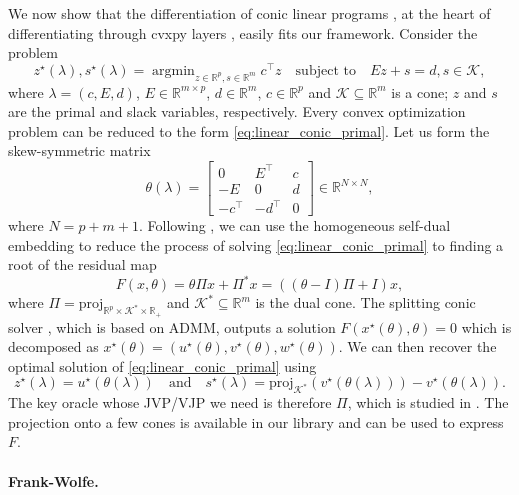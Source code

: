 \documentclass{article}
\def\cK{{\mathcal{K}}}
\def\RR{{\mathbb R}}
\def\proj{{\text{proj}}}
\DeclareMathOperator*{\argmin}{argmin}
\begin{document}
We now show that the differentiation of conic linear programs
\cite{agrawal_cone,amos_thesis}, at the heart of differentiating through cvxpy
layers \cite{agrawal_2019}, easily fits our framework.
Consider the problem
\begin{equation}
z^\star(\lambda), s^\star(\lambda) =
\argmin_{z \in \RR^p, s \in \RR^m} c^\top z 
\quad \text{subject to} \quad
Ez + s = d, s \in \cK,
\label{eq:linear_conic_primal}
\end{equation}
where $\lambda = (c, E, d)$, 
$E \in \RR^{m \times p}$, $d \in \RR^m$, $c \in \RR^p$ and $\cK \subseteq
\RR^m$ is a cone;
$z$ and $s$ are the primal and slack variables, respectively.
Every convex optimization problem can be reduced to the form
\eqref{eq:linear_conic_primal}.
Let us form the skew-symmetric matrix
\begin{equation}
\theta(\lambda) =
\begin{bmatrix}
    0 & E^\top & c \\
    -E & 0 & d \\
    -c^\top & -d^\top & 0
\end{bmatrix}
\in \RR^{N \times N},
\end{equation}
where $N = p + m + 1$.
Following \cite{agrawal_cone,agrawal_2019,amos_thesis},
we can use the homogeneous self-dual embedding 
to reduce the process of solving \eqref{eq:linear_conic_primal} to finding
a root of the residual map
\begin{equation}
F(x, \theta) 
= \theta \Pi x + \Pi^* x
= ((\theta - I) \Pi + I) x,
\label{eq:residual_map}
\end{equation}
where $\Pi = \proj_{\RR^p \times \cK^* \times \RR_+}$
and $\cK^* \subseteq \RR^m$ is the dual cone. 
The splitting conic solver \cite{splitting_conic}, which is based on 
ADMM, outputs a solution 
$F(x^\star(\theta), \theta) = 0$ which is decomposed as
$x^\star(\theta) = (u^\star(\theta), v^\star(\theta), 
w^\star(\theta))$. We can then recover the optimal solution of
\eqref{eq:linear_conic_primal} using
\begin{equation}
z^\star(\lambda) = u^\star(\theta(\lambda))
\quad \text{and} \quad
s^\star(\lambda) = \proj_{\cK^*}(v^\star(\theta(\lambda))) -
v^\star(\theta(\lambda)).
\end{equation}
The key oracle whose JVP/VJP we need 
is therefore $\Pi$, which is studied in \cite{ali_2017}.
The projection onto a few cones is available in our library
and can be used to express $F$.

\paragraph{Frank-Wolfe.}
\end{document}
